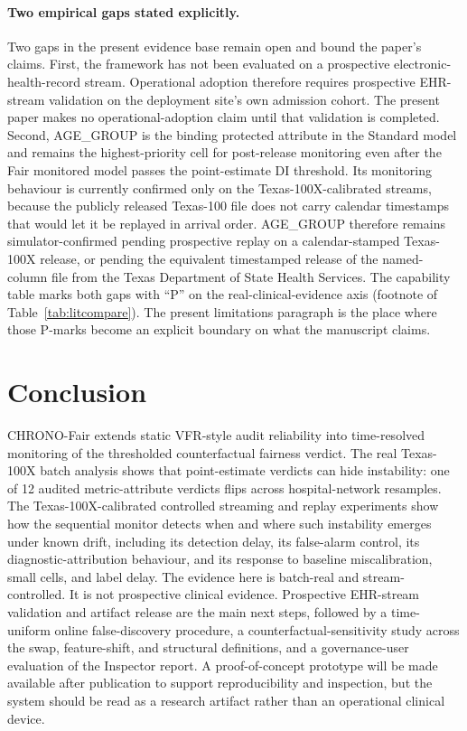 \documentclass[acmsmall,nonacm,review,anonymous]{acmart}
\newcommand{\1}[1]{\mathbf{1}\!\left\{#1\right\}}
\begin{document}
\paragraph{Two empirical gaps stated explicitly.}
Two gaps in the present evidence base remain open and bound the paper's claims. First, the framework has not been evaluated on a prospective electronic-health-record stream. Operational adoption therefore requires prospective EHR-stream validation on the deployment site's own admission cohort. The present paper makes no operational-adoption claim until that validation is completed. Second, AGE\_GROUP is the binding protected attribute in the Standard model and remains the highest-priority cell for post-release monitoring even after the Fair monitored model passes the point-estimate DI threshold. Its monitoring behaviour is currently confirmed only on the Texas-100X-calibrated streams, because the publicly released Texas-100 file does not carry calendar timestamps that would let it be replayed in arrival order. AGE\_GROUP therefore remains simulator-confirmed pending prospective replay on a calendar-stamped Texas-100X release, or pending the equivalent timestamped release of the named-column file from the Texas Department of State Health Services. The capability table marks both gaps with ``P'' on the real-clinical-evidence axis (footnote of Table~\ref{tab:litcompare}). The present limitations paragraph is the place where those P-marks become an explicit boundary on what the manuscript claims.

\section{Conclusion}\label{sec:conclusion}

CHRONO-Fair extends static VFR-style audit reliability into time-resolved monitoring of the thresholded counterfactual fairness verdict. The real Texas-100X batch analysis shows that point-estimate verdicts can hide instability: one of 12 audited metric-attribute verdicts flips across hospital-network resamples. The Texas-100X-calibrated controlled streaming and replay experiments show how the sequential monitor detects when and where such instability emerges under known drift, including its detection delay, its false-alarm control, its diagnostic-attribution behaviour, and its response to baseline miscalibration, small cells, and label delay. The evidence here is batch-real and stream-controlled. It is not prospective clinical evidence. Prospective EHR-stream validation and artifact release are the main next steps, followed by a time-uniform online false-discovery procedure, a counterfactual-sensitivity study across the swap, feature-shift, and structural definitions, and a governance-user evaluation of the Inspector report. A proof-of-concept prototype will be made available after publication to support reproducibility and inspection, but the system should be read as a research artifact rather than an operational clinical device.
\end{document}
